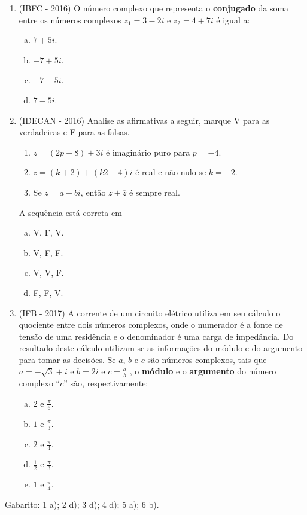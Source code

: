\begin{enumerate}
  \item (IBFC - 2016) O número complexo que representa o \textbf{conjugado} da soma entre os números complexos $z_1= 3 - 2i$ e $z_2 = 4 + 7i$ é igual a: 
  \begin{enumerate}[a)]
  \item $7+5i$.
  \item $-7+5i$.
  \item $-7-5i$.
  \item $7-5i$.
  \end{enumerate}
  
  \item (IDECAN - 2016) Analise as afirmativas a seguir, marque V para as verdadeiras e F para as falsas. 
 
   \begin{enumerate}[( \ \ )]
  \item $z = (2p + 8) + 3i$ é imaginário puro para $p = -4$.
  \item $z = (k + 2) + (k2 - 4)i$ é real e não nulo se $k = -2$.
  \item Se $z = a + bi$, então $z + \overline{z}$ é sempre real. 
  \end{enumerate}
  A sequência está correta em
  \begin{enumerate}[a)]
  \item V, F, V.
  \item V, F, F.
  \item V, V, F.
  \item F, F, V.
  \end{enumerate}
  
   \item (IFB - 2017) A corrente de um circuito elétrico utiliza em seu cálculo o quociente entre dois números complexos, onde o numerador é a fonte de tensão de uma residência e o denominador é uma carga de impedância. Do resultado deste cálculo utilizam-se as informações do módulo e do argumento para tomar as decisões. Se $a$, $b$ e $c$ são números complexos, tais que $a = -\sqrt{3}+ i$ e $b = 2i$ e $c = \frac{a}{b}$ , o \textbf{módulo} e o \textbf{argumento} do número complexo “$c$” são, respectivamente:  
 
  \begin{enumerate}[a)]
  \item $2$ e $\frac{\pi}{6}$.
  \item $1$ e $\frac{\pi}{3}$.
  \item $2$ e $\frac{\pi}{4}$.
  \item $\frac{1}{2}$ e $\frac{\pi}{3}$.
  \item $1$ e $\frac{\pi}{4}$.
  \end{enumerate}
 \end{enumerate}
 
 Gabarito: 1 a); 2 d); 3 d); 4 d); 5 a); 6 b).
